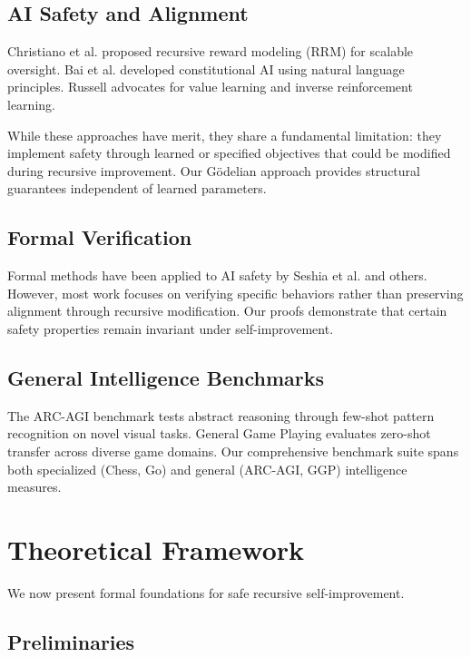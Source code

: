 \documentclass[11pt,letterpaper]{article}
\begin{document}
\subsection{AI Safety and Alignment}

Christiano et al. \cite{christiano2017} proposed recursive reward modeling (RRM) for scalable oversight. Bai et al. \cite{bai2022} developed constitutional AI using natural language principles. Russell \cite{russell2019} advocates for value learning and inverse reinforcement learning.

While these approaches have merit, they share a fundamental limitation: they implement safety through learned or specified objectives that could be modified during recursive improvement. Our Gödelian approach provides structural guarantees independent of learned parameters.

\subsection{Formal Verification}

Formal methods have been applied to AI safety by Seshia et al. \cite{seshia2016} and others. However, most work focuses on verifying specific behaviors rather than preserving alignment through recursive modification. Our proofs demonstrate that certain safety properties remain invariant under self-improvement.

\subsection{General Intelligence Benchmarks}

The ARC-AGI benchmark \cite{chollet2019} tests abstract reasoning through few-shot pattern recognition on novel visual tasks. General Game Playing \cite{genesereth2005} evaluates zero-shot transfer across diverse game domains. Our comprehensive benchmark suite spans both specialized (Chess, Go) and general (ARC-AGI, GGP) intelligence measures.

\section{Theoretical Framework}

We now present formal foundations for safe recursive self-improvement.

\subsection{Preliminaries}
\end{document}
